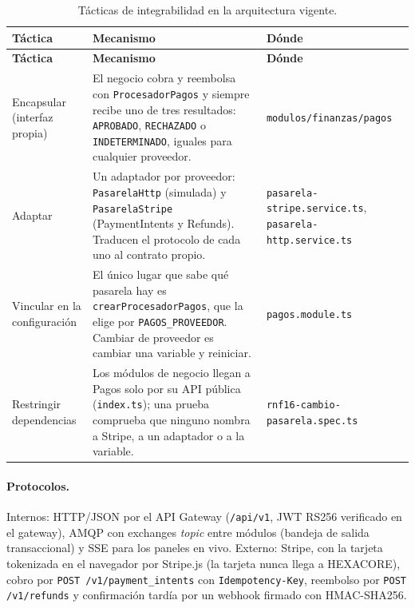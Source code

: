 \begin{center}
\begin{longtable}{|>{\raggedright\arraybackslash}p{2.8cm}|>{\raggedright\arraybackslash}p{6.7cm}|>{\raggedright\arraybackslash}p{3.8cm}|}
\caption{Tácticas de integrabilidad en la arquitectura vigente.}\label{tab:integrabilidad-vigente}\\
\hline
\textbf{Táctica} & \textbf{Mecanismo} & \textbf{Dónde}\\
\hline
\endfirsthead
\hline
\textbf{Táctica} & \textbf{Mecanismo} & \textbf{Dónde}\\
\hline
\endhead
Encapsular (interfaz propia) &
El negocio cobra y reembolsa con \texttt{ProcesadorPagos} y siempre recibe uno de tres resultados:
\texttt{APROBADO}, \texttt{RECHAZADO} o \texttt{INDETERMINADO}, iguales para cualquier proveedor. &
\texttt{modulos/\allowbreak finanzas/\allowbreak pagos}\\
\hline
Adaptar &
Un adaptador por proveedor: \texttt{PasarelaHttp} (simulada) y \texttt{PasarelaStripe}
(PaymentIntents y Refunds). Traducen el protocolo de cada uno al contrato propio. &
\texttt{pasarela-stripe.\allowbreak service.ts}, \texttt{pasarela-http.\allowbreak service.ts}\\
\hline
Vincular en la configuración &
El único lugar que sabe qué pasarela hay es \texttt{crearProcesadorPagos}, que la elige por
\texttt{PAGOS\_PROVEEDOR}. Cambiar de proveedor es cambiar una variable y reiniciar. &
\texttt{pagos.module.ts}\\
\hline
Restringir dependencias &
Los módulos de negocio llegan a Pagos solo por su API pública (\texttt{index.ts}); una prueba
comprueba que ninguno nombra a Stripe, a un adaptador o a la variable. &
\texttt{rnf16-cambio-\allowbreak pasarela.spec.ts}\\
\hline
\end{longtable}
\end{center}

\paragraph{Protocolos.} Internos: HTTP/JSON por el API Gateway (\texttt{/api/v1}, JWT RS256
verificado en el gateway), AMQP con exchanges \emph{topic} entre módulos (bandeja de salida
transaccional) y SSE para los paneles en vivo. Externo: Stripe, con la tarjeta tokenizada en el
navegador por Stripe.js (la tarjeta nunca llega a HEXACORE), cobro por \texttt{POST
/v1/payment\_intents} con \texttt{Idempotency-Key}, reembolso por \texttt{POST /v1/refunds} y
confirmación tardía por un webhook firmado con HMAC-SHA256.

